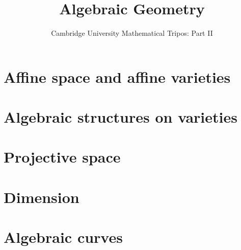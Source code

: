 \documentclass{article}
\title{Algebraic Geometry}
\author{Cambridge University Mathematical Tripos: Part II}
\begin{document}
\maketitle

\tableofcontentsnewpage{}


\section{Affine space and affine varieties}

\section{Algebraic structures on varieties}

\section{Projective space}

\section{Dimension}

\section{Algebraic curves}

\end{document}
